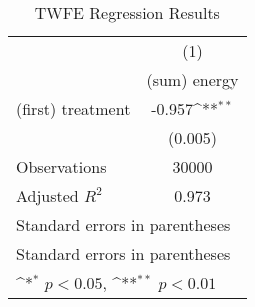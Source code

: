 \begin{table}[htbp]\centering
\def\sym#1{\ifmmode^{#1}\else\(^{#1}\)\fi}
\caption{TWFE Regression Results}
\begin{tabular}{l*{1}{c}}
\hline\hline
                    &\multicolumn{1}{c}{(1)}\\
                    &\multicolumn{1}{c}{(sum) energy}\\
\hline
(first) treatment   &      -0.957\sym{**}\\
                    &     (0.005)        \\
\hline
Observations        &       30000        \\
Adjusted \(R^{2}\)  &       0.973        \\
\hline\hline
\multicolumn{2}{l}{\footnotesize Standard errors in parentheses}\\
\multicolumn{2}{l}{\footnotesize Standard errors in parentheses}\\
\multicolumn{2}{l}{\footnotesize \sym{*} \(p<0.05\), \sym{**} \(p<0.01\)}\\
\end{tabular}
\end{table}
